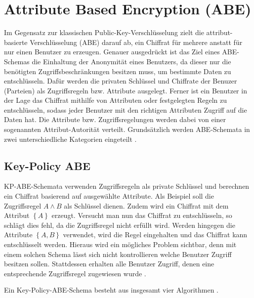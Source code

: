 \section{Attribute Based Encryption (ABE)}
Im Gegensatz zur klassischen Public-Key-Verschlüsselung zielt die
attribut-basierte Verschlüsselung (ABE) darauf ab, ein Chiffrat für mehrere
anstatt für nur einen Benutzer zu erzeugen. Genauer ausgedrückt ist das Ziel
eines ABE-Schemas die Einhaltung der Anonymität eines Benutzers, da dieser nur
die benötigten Zugriffsbeschränkungen besitzen muss, um bestimmte Daten zu
entschlüsseln. Dafür werden die privaten Schlüssel und Chiffrate der Benuzer
(Parteien) als Zugriffsregeln bzw.  Attribute ausgelegt. Ferner ist ein Benutzer
in der Lage das Chiffrat mithilfe von Attributen oder festgelegten Regeln zu
entschlüsseln, sodass jeder Benutzer mit den richtigen Attributen Zugriff auf
die Daten hat. Die Attribute bzw.  Zugriffsregelungen werden dabei von einer
sogenannten Attribut-Autorität verteilt.  Grundsätzlich werden ABE-Schemata in
zwei unterschiedliche Kategorien eingeteilt
\cite{phoabe}.

\subsection{Key-Policy ABE}
KP-ABE-Schemata verwenden Zugriffsregeln als private Schlüs\-sel und berechnen
ein Chiffrat basierend auf ausgewählte Attribute. Als Beispiel soll die
Zugriffsregel $A \land B$ als Schlüssel dienen. Zudem wird ein Chiffrat mit
dem Attribut $\left\{A\right\}$ erzeugt. Versucht man nun das Chiffrat zu entschlüsseln,
so schlägt dies fehl, da die Zugriffsregel nicht erfüllt wird. Werden hingegen
die Attribute $\left\{A, B\right\}$ verwendet, wird die Regel eingehalten und
das Chiffrat kann entschlüsselt werden. Hieraus wird ein mögliches Problem
sichtbar, denn mit einem solchen Schema lässt sich nicht kontrollieren welche
Benutzer Zugriff besitzen sollen. Stattdessen erhalten alle Benutzer Zugriff,
denen eine entsprechende Zugriffsregel zugewiesen wurde \cite{cp-abe-ieee}.

Ein Key-Policy-ABE-Schema besteht aus insgesamt vier Algorithmen \cite{kp-abe}.

